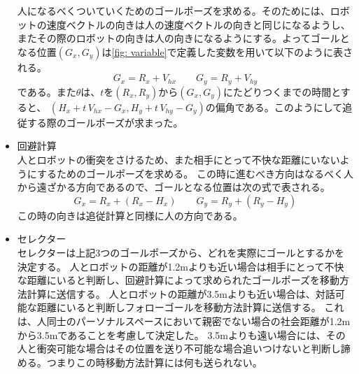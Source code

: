 \documentclass{kuisthesis}
\begin{document}
\begin{itemize}
  \quad 人になるべくついていくためのゴールポーズを求める。そのためには、ロボットの速度ベクトルの向きは人の速度ベクトルの向きと同じになるようし、
  またその際のロボットの向きは人の向きになるようにする。よってゴールとなる位置$(G_x, G_y)$は\ref{fig: variable}で定義した変数を用いて以下のように表される。
  \begin{equation}G_x = R_x + V_{hx} \qquad G_y = R_y + V_{hy}\end{equation}
  である。また$\theta$は、$t$を$(R_x, R_y)$から$(G_x, G_y)$にたどりつくまでの時間とすると、
  $(H_x + t\,V_{hx} - G_x, H_y + t\,V_{hy} - G_y)$の偏角である。このようにして追従する際のゴールポーズが求まった。

  \item 回避計算 \\
  \quad 人とロボットの衝突をさけるため、また相手にとって不快な距離にいないようにするためのゴールポーズを求める。
  この時に進むべき方向はなるべく人から遠ざかる方向であるので、ゴールとなる位置は次の式で表される。
  \begin{equation}
    G_x = R_x + (R_x - H_x) \qquad G_y = R_y + (R_y - H_y)
  \end{equation}
  この時の向きは追従計算と同様に人の方向である。
  \item セレクター \\
  \quad セレクターは上記3つのゴールポーズから、どれを実際にゴールとするかを決定する。
  人とロボットの距離が1.2mよりも近い場合は相手にとって不快な距離にいると判断し、回避計算によって求められたゴールポーズを移動方法計算に送信する。
  人とロボットの距離が3.5mよりも近い場合は、対話可能な距離にいると判断しフォローゴールを移動方法計算に送信する。
  これは、人同士のパーソナルスペースにおいて親密でない場合の社会距離が1.2mから3.5mであることを考慮して決定した。
  3.5mよりも遠い場合には、その人と衝突可能な場合はその位置を送り不可能な場合追いつけないと判断し諦める。つまりこの時移動方法計算には何も送られない。


\end{itemize}
\end{document}
